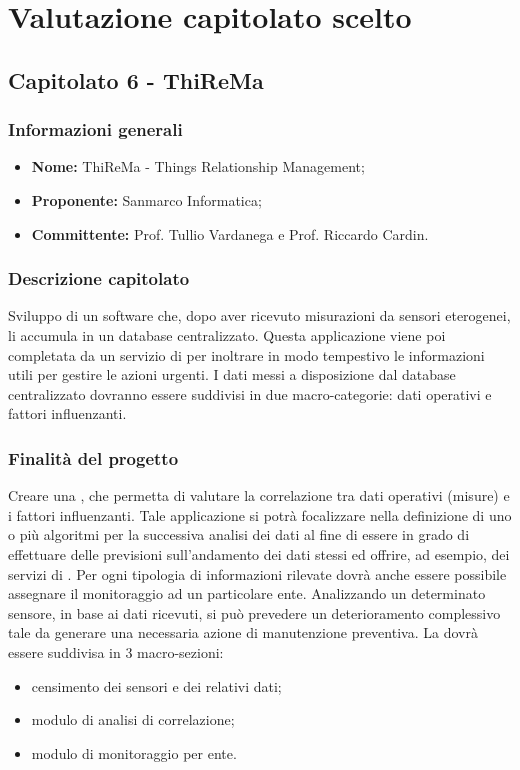 

\section{Valutazione capitolato scelto}

	\subsection{Capitolato 6 - ThiReMa}

	\subsubsection{Informazioni generali}
	\begin{itemize}
		\item \textbf{Nome:} ThiReMa - Things Relationship Management;
		\item \textbf{Proponente:} Sanmarco Informatica;
		\item \textbf{Committente: }Prof. Tullio Vardanega e Prof. Riccardo Cardin.
	\end{itemize}

	\subsubsection{Descrizione capitolato}
	Sviluppo di un software che,  dopo aver ricevuto misurazioni da sensori eterogenei, li accumula in un database centralizzato. Questa applicazione viene poi completata da un servizio di  per inoltrare in modo tempestivo le informazioni utili per gestire le azioni urgenti.
	I dati messi a disposizione dal database centralizzato dovranno essere suddivisi in due macro-categorie: dati operativi e fattori influenzanti.

	\subsubsection{Finalità del progetto}
	Creare una , che permetta di valutare la correlazione tra dati operativi (misure) e i fattori influenzanti. Tale applicazione si potrà focalizzare nella definizione di uno o più algoritmi per la successiva analisi dei dati al fine di essere in grado di effettuare delle previsioni sull’andamento dei dati stessi ed offrire, ad esempio, dei servizi di .
	Per ogni tipologia di informazioni rilevate dovrà anche essere possibile assegnare il monitoraggio ad un particolare ente.
	Analizzando un determinato sensore, in base ai dati ricevuti, si può prevedere un deterioramento complessivo tale da generare una necessaria azione di manutenzione preventiva.
	La  dovrà essere suddivisa in 3 macro-sezioni:
	\begin{itemize}
		\item censimento dei sensori e dei relativi dati;
		\item modulo di analisi di correlazione;
		\item modulo di monitoraggio per ente.
	\end{itemize}

